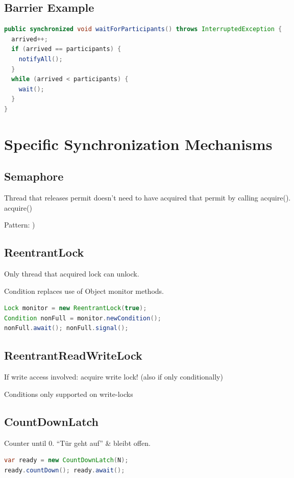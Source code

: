 \begin{multicols*}{4}
    \subsection{Barrier Example}
    \begin{lstlisting}[language=java]
public synchronized void waitForParticipants() throws InterruptedException {
  arrived++;
  if (arrived == participants) {
    notifyAll();
  }
  while (arrived < participants) {
    wait();
  }
}
\end{lstlisting}

\section{Specific Synchronization Mechanisms}
    \subsection{Semaphore}
    Thread that releases permit doesn't need to have acquired that permit by calling acquire().\\
    acquire() 

    Pattern:
    )
    \subsection{ReentrantLock}
    Only thread that acquired lock can unlock.

    Condition replaces use of Object monitor methods.
    \begin{lstlisting}[language=java]
Lock monitor = new ReentrantLock(true);
Condition nonFull = monitor.newCondition();
nonFull.await(); nonFull.signal();
\end{lstlisting}

    \subsection{ReentrantReadWriteLock}
    If write access involved: acquire write lock! (also if only conditionally)

    Conditions only supported on write-locks

    \subsection{CountDownLatch}
    Counter until 0. ``Tür geht auf'' \& bleibt offen.
    \begin{lstlisting}[language=java]
var ready = new CountDownLatch(N);
ready.countDown(); ready.await();
\end{lstlisting}


\end{multicols*}
